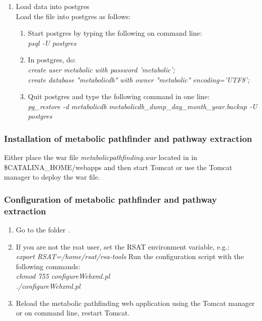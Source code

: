 \documentclass{book}
\begin{document}
\begin{enumerate}
\begin{enumerate}
\item Load data into postgres\\
Load the  file into postgres as follows:
\begin{enumerate}
\item Start postgres by typing the following on command line:\\
\textit{psql -U postgres}
\item In postgres, do:\\
\textit{create user metabolic with password 'metabolic';}\\
\textit{create database "metabolicdb" with owner "metabolic" encoding='UTF8';}
\item Quit postgres and type the following command in one line:\\
\textit{pg\_restore -d metabolicdb metabolicdb\_dump\_day\_month\_year.backup -U postgres}
\end{enumerate}

\end{enumerate}

\end{enumerate}

\subsubsection{Installation of metabolic pathfinder and pathway extraction}
Either place the war file \textit{metabolicpathfinding.war} located
in  in\\
\$CATALINA\_HOME/webapps and then start
Tomcat or use the Tomcat manager to deploy the war file.

\subsubsection{Configuration of metabolic pathfinder and pathway extraction}

\begin{enumerate}
\item Go to the folder .

\item If you are not the rsat user, set the RSAT environment variable, e.g.:\\
      \textit{export RSAT=/home/rsat/rsa-tools}
      Run the configuration script with the following commands:\\
      \textit{chmod 755 configureWebxml.pl}\\
      \textit{./configureWebxml.pl}

\item Reload the metabolic pathfinding web application using the Tomcat manager or
      on command line, restart Tomcat.
\end{enumerate}
\end{document}
